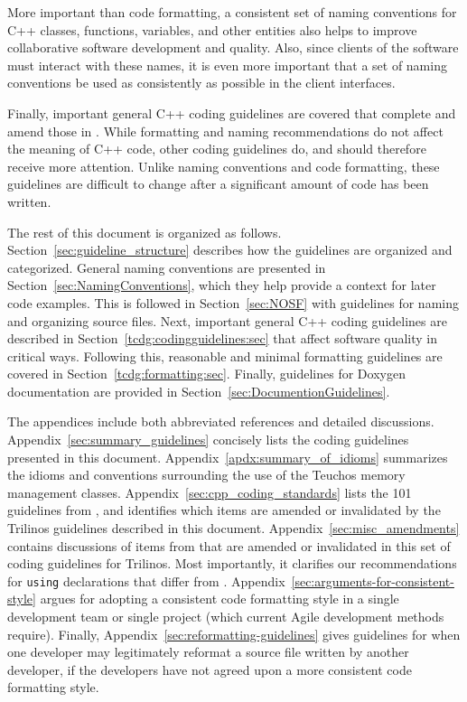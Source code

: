 More important than code formatting, a consistent set of naming
conventions for C++ classes, functions, variables, and other entities
also helps to improve collaborative software development and quality.
Also, since clients of the software must interact with these names, it
is even more important that a set of naming conventions be used as
consistently as possible in the client interfaces.

Finally, important general C++ coding guidelines are covered that
complete and amend those in {}\cite{C++CodingStandards05}.  While
formatting and naming recommendations do not affect the meaning of C++
code, other coding guidelines do, and should therefore receive more
attention.  Unlike naming conventions and code formatting, these
guidelines are difficult to change after a significant amount of code
has been written.

The rest of this document is organized as follows.
Section~\ref{sec:guideline_structure} describes how the guidelines are
organized and categorized.  General naming conventions are presented
in Section~\ref{sec:NamingConventions}, which they help provide a
context for later code examples.  This is followed in
Section~\ref{sec:NOSF} with guidelines for naming and organizing
source files.  Next, important general C++ coding guidelines are
described in Section~\ref{tcdg:codingguidelines:sec} that affect
software quality in critical ways.  Following this, reasonable and
minimal formatting guidelines are covered in
Section~\ref{tcdg:formatting:sec}.  Finally, guidelines for Doxygen
documentation are provided in Section~\ref{sec:DocumentionGuidelines}.

The appendices include both abbreviated references and detailed
discussions.  Appendix~\ref{sec:summary_guidelines} concisely lists
the coding guidelines presented in this document.
Appendix~\ref{apdx:summary_of_idioms} summarizes the idioms and
conventions surrounding the use of the Teuchos memory management
classes.  Appendix~\ref{sec:cpp_coding_standards} lists the 101
guidelines from {}\cite{C++CodingStandards05}, and identifies which
items are amended or invalidated by the Trilinos guidelines described
in this document.  Appendix~\ref{sec:misc_amendments} contains
discussions of items from {}\cite{C++CodingStandards05} that are
amended or invalidated in this set of coding guidelines for Trilinos.
Most importantly, it clarifies our recommendations for
{}\texttt{using} declarations that differ from {}\cite[Item
59]{C++CodingStandards05}.
Appendix~\ref{sec:arguments-for-consistent-style} argues for adopting
a consistent code formatting style in a single development team or
single project (which current Agile development methods require).
Finally, Appendix~\ref{sec:reformatting-guidelines} gives guidelines
for when one developer may legitimately reformat a source file written
by another developer, if the developers have not agreed upon a more
consistent code formatting style.


